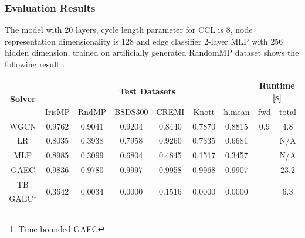 \documentclass{beamer}
\begin{document}
\begin{frame}
    \frametitle{Evaluation Results}

    The model with 20 layers, cycle length parameter for CCL is $8$,
    node representation dimensionality is 128 and edge classifier 2-layer
    MLP with 256 hidden dimension, trained on artificially generated RandomMP dataset
    shows the following result \cite{jung2022learning}.

    \begin{table}
        \scalebox{0.75}
        {
            \begin{tabular}{|c|*{6}{c}|cc|}
                \hline
                \multirow{2}{*}{\textbf{Solver}}    & \multicolumn{6}{c|}{\textbf{Test Datasets}} & \multicolumn{2}{c|}{\textbf{Runtime [s]}}                                                                                                       \\
                                                    & IrisMP                                      & RndMP                                     & BSDS300 & CREMI  & Knott                                                   & h.mean & fwd & total   \\
                \hline
                \hline
                WGCN                                & 0.9762                                      & 0.9041                                    & 0.9204  & 0.8440 & 0.7870                                                  & 0.8815 & 0.9 & 4.8     \\
                \hline
                LR                                  & 0.8035                                      & 0.3938                                    & 0.7958  & 0.9260 & 0.7335                                                  & 0.6681 &     & N/A     \\
                MLP                                 & 0.8985                                      & 0.3099                                    & 0.6804  & 0.4845 & 0.1517                                                  & 0.3457 &     & N/A     \\
                \hline
                GAEC                                & 0.9836                                      & 0.9780                                    & 0.9997  & 0.9958 & 0.9968                                                  & 0.9907 &     & 23.2    \\
                TB GAEC\footnote{Time bounded GAEC} & 0.3642                                      & 0.0034                                    & 0.0000  & 0.1516 & 0.0000                                                  & 0.0000 &     & 6.3     \\

\end{tabular}}
\end{table}
\end{frame}
\end{document}
